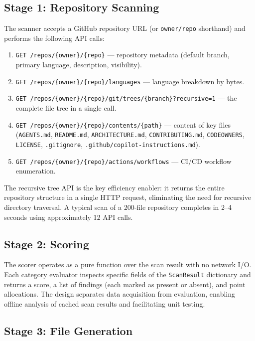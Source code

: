 \documentclass[11pt,twocolumn]{article}
\begin{document}
\subsection{Stage 1: Repository Scanning}

The scanner accepts a GitHub repository URL (or \texttt{owner/repo}
shorthand) and performs the following API calls:

\begin{enumerate}[leftmargin=1.5em]
    \item \texttt{GET /repos/\{owner\}/\{repo\}} --- repository metadata
          (default branch, primary language, description, visibility).
    \item \texttt{GET /repos/\{owner\}/\{repo\}/languages} --- language
          breakdown by bytes.
    \item \texttt{GET /repos/\{owner\}/\{repo\}/git/trees/\{branch\}?recursive=1}
          --- the complete file tree in a single call.
    \item \texttt{GET /repos/\{owner\}/\{repo\}/contents/\{path\}} ---
          content of key files (\texttt{AGENTS.md}, \texttt{README.md},
          \texttt{ARCHITECTURE.md}, \texttt{CONTRIBUTING.md},
          \texttt{CODEOWNERS}, \texttt{LICENSE}, \texttt{.gitignore},
          \texttt{.github/copilot-instructions.md}).
    \item \texttt{GET /repos/\{owner\}/\{repo\}/actions/workflows} ---
          CI/CD workflow enumeration.
\end{enumerate}

The recursive tree API is the key efficiency enabler: it returns the
entire repository structure in a single HTTP request, eliminating the
need for recursive directory traversal. A typical scan of a 200-file
repository completes in 2--4 seconds using approximately 12 API calls.

\subsection{Stage 2: Scoring}

The scorer operates as a pure function over the scan result with no
network I/O. Each category evaluator inspects specific fields of the
\texttt{ScanResult} dictionary and returns a score, a list of findings
(each marked as present or absent), and point allocations. The design
separates data acquisition from evaluation, enabling offline analysis
of cached scan results and facilitating unit testing.

\subsection{Stage 3: File Generation}
\label{sec:generator}
\end{document}
